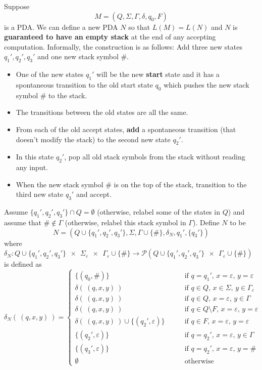 \documentclass[12pt, oneside]{article}
\begin{document}
\begin{enumerate}
    Suppose 
    \[
    M = (Q, \Sigma, \Gamma, \delta, q_0, F)
    \]
    is a PDA.  We can define a new
PDA $N$ so that $L(M) = L(N)$ and $N$ is {\bf guaranteed to have an empty stack} at the 
end of any accepting computation. 
Informally, the construction is as follows: Add three new states $q_1', q_2', q_3'$ and one new
stack symbol $\#$.  
\begin{itemize}
\item One of the new states $q_1'$ will be the new {\bf start} state and it has a spontaneous transition to the old start state $q_0$ which pushes the new stack symbol $\#$ to the stack. 
\item The transitions between the old states are all the same.
\item From each of the old accept states, {\bf add} a spontaneous
transition (that doesn't modify the stack) to the second new state $q_2'$.  
\item In this state $q_2'$, pop all old stack
symbols from the stack without reading any input. 
\item When the new stack symbol $\#$ is on the top of the stack, transition to the third new state $q_3'$ and accept.
\end{itemize}
Assume $\{ q_1', q_2', q_3'\} \cap Q = \emptyset$ (otherwise, relabel 
some of the states in $Q$) and assume that $\# \notin \Gamma$ (otherwise, relabel this stack symbol 
in $\Gamma$).  Define $N$ to be
\[
N = ( Q \cup \{ q_1', q_2', q_3'\} , \Sigma, \Gamma \cup \{\#\}, \delta_N, q_1', \{q_3'\} )
\]
where 
$\delta_N : Q \cup \{ q_1', q_2', q_3'\}~~\times~~ \Sigma_\varepsilon ~~\times~~\Gamma_\varepsilon\cup \{\#\}
\to \mathcal{P}( Q \cup \{ q_1', q_2', q_3'\} ~~\times ~~\Gamma_\varepsilon\cup \{\#\})$  is defined as
\[
\delta_N ( ~(q, x, y)~) = \begin{cases}
\{ (q_0, \#) \} &\qquad \text{if $q = q_1'$, $x = \varepsilon$, $y = \varepsilon$} \\
\delta( ~(q, x, y)~)  & \qquad \text{if $q \in Q$, $x \in \Sigma$, $y \in \Gamma_\varepsilon$} \\
\delta( ~(q, x, y)~)  & \qquad \text{if $q \in Q$, $x=\varepsilon$, $y \in \Gamma$} \\
\delta( ~(q, x, y)~)  & \qquad \text{if $q \in Q  \setminus F$, $x=\varepsilon$, $y =\varepsilon$} \\
\delta( ~(q, x, y)~) \cup \{  (q_2', \varepsilon) \}  & \qquad \text{if $q \in F$, $x=\varepsilon$, $y =\varepsilon$} \\
\{ (q_2', \varepsilon)\} & \qquad \text{if $q = q_2'$, $x = \varepsilon$, $y \in  \Gamma$} \\
\{ (q_3', \varepsilon)\} & \qquad \text{if $q = q_2'$, $x = \varepsilon$, $y = \#$} \\
\emptyset & \qquad \text{otherwise}
\end{cases}
\]


\end{enumerate}
\end{document}
